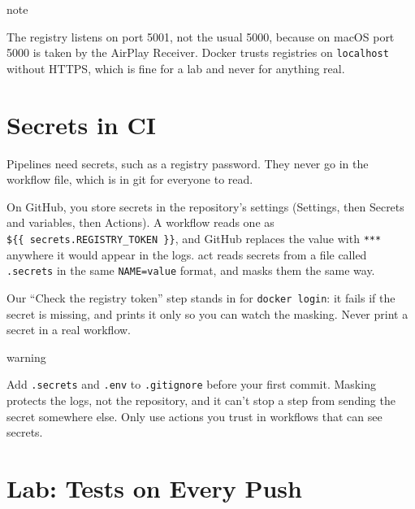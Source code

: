 \begin{callout}{note}

The registry listens on port 5001, not the usual 5000, because on macOS port 5000 is taken by the AirPlay Receiver. Docker trusts registries on \texttt{localhost} without HTTPS, which is fine for a lab and never for anything real.

\end{callout}

\section{Secrets in CI}\label{06-your-first-pipeline:secrets-in-ci}

Pipelines need secrets, such as a registry password. They never go in the workflow file, which is in git for everyone to read.

On GitHub, you store secrets in the repository's settings (Settings, then Secrets and variables, then Actions). A workflow reads one as \texttt{\$\{\{\ secrets.}\allowbreak{}\texttt{REGISTRY\_}\allowbreak{}\texttt{TOKEN\ \}\}}, and GitHub replaces the value with \texttt{***} anywhere it would appear in the logs. act reads secrets from a file called \texttt{.secrets} in the same \texttt{NAME=value} format, and masks them the same way.

Our ``Check the registry token'' step stands in for \texttt{docker\ login}: it fails if the secret is missing, and prints it only so you can watch the masking. Never print a secret in a real workflow.

\begin{callout}{warning}

Add \texttt{.secrets} and \texttt{.env} to \texttt{.gitignore} before your first commit. Masking protects the logs, not the repository, and it can't stop a step from sending the secret somewhere else. Only use actions you trust in workflows that can see secrets.

\end{callout}

\section{Lab: Tests on Every Push}\label{06-your-first-pipeline:lab-tests-on-every-push}

